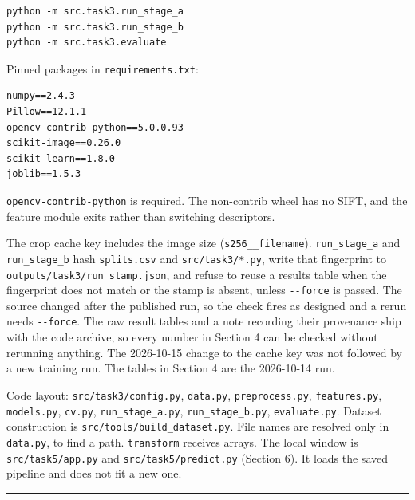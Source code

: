\documentclass[11pt,a4paper]{article}
\begin{document}
\begin{verbatim}
python -m src.task3.run_stage_a
python -m src.task3.run_stage_b
python -m src.task3.evaluate
\end{verbatim}

Pinned packages in \texttt{requirements.txt}:

\begin{verbatim}
numpy==2.4.3
Pillow==12.1.1
opencv-contrib-python==5.0.0.93
scikit-image==0.26.0
scikit-learn==1.8.0
joblib==1.5.3
\end{verbatim}

\texttt{opencv-\allowbreak{}contrib-\allowbreak{}python} is required. The non-contrib wheel has no SIFT, and the feature module exits rather than switching descriptors.

The crop cache key includes the image size (\texttt{s256\_\allowbreak{}\_\allowbreak{}filename}). \texttt{run\_\allowbreak{}stage\_\allowbreak{}a} and \texttt{run\_\allowbreak{}stage\_\allowbreak{}b} hash \texttt{splits.csv} and \texttt{src/\allowbreak{}task3/\allowbreak{}*.py}, write that fingerprint to \texttt{outputs/\allowbreak{}task3/\allowbreak{}run\_\allowbreak{}stamp.json}, and refuse to reuse a results table when the fingerprint does not match or the stamp is absent, unless \texttt{-\allowbreak{}\/\allowbreak{}-\allowbreak{}force} is passed. The source changed after the published run, so the check fires as designed and a rerun needs \texttt{-\allowbreak{}\/\allowbreak{}-\allowbreak{}force}. The raw result tables and a note recording their provenance ship with the code archive, so every number in Section 4 can be checked without rerunning anything. The 2026-10-15 change to the cache key was not followed by a new training run. The tables in Section 4 are the 2026-10-14 run.

Code layout: \texttt{src/\allowbreak{}task3/\allowbreak{}config.py}, \texttt{data.py}, \texttt{preprocess.py}, \texttt{features.py}, \texttt{models.py}, \texttt{cv.py}, \texttt{run\_\allowbreak{}stage\_\allowbreak{}a.py}, \texttt{run\_\allowbreak{}stage\_\allowbreak{}b.py}, \texttt{evaluate.py}. Dataset construction is \texttt{src/\allowbreak{}tools/\allowbreak{}build\_\allowbreak{}dataset.py}. File names are resolved only in \texttt{data.py}, to find a path. \texttt{transform} receives arrays. The local window is \texttt{src/\allowbreak{}task5/\allowbreak{}app.py} and \texttt{src/\allowbreak{}task5/\allowbreak{}predict.py} (Section 6). It loads the saved pipeline and does not fit a new one.

\begin{center}\rule{0.5\linewidth}{0.5pt}\end{center}
\end{document}
